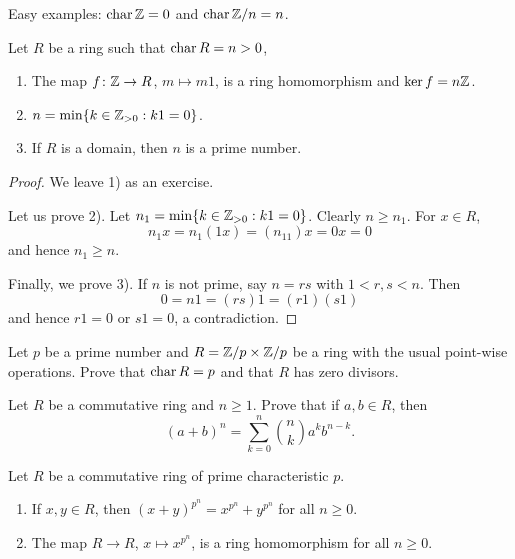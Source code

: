 Easy examples: $\operatorname{char}\mathbb{Z}=0$ and $\operatorname{char}\mathbb{Z}/n=n$.

\begin{proposition}
    Let $R$ be a ring such that $\operatorname{char} R=n>0$,
    \begin{enumerate}
        \item The map $f\colon \mathbb{Z}\to R$, $m\mapsto m1$, is a ring homomorphism and $\ker f=n\mathbb{Z}$.  
        \item $n=\min\{k\in\mathbb{Z}_{>0}:k1=0\}$.
        \item If $R$ is a domain, then $n$ is a prime number.
    \end{enumerate}
\end{proposition}

\begin{proof}
    We leave 1) as an exercise. 
    
    Let us prove 2). Let $n_1=\min\{k\in\mathbb{Z}_{>0}:k1=0\}$. Clearly 
    $n\geq n_1$. For $x\in R$,
    \[ 
    n_1x=n_1(1x)=(n_11)x=0x=0
    \]
    and hence $n_1\geq n$. 
    
    Finally, we prove 3). If $n$ is not prime, say
    $n=rs$ with $1<r,s<n$. Then 
    \[
    0=n1=(rs)1=(r1)(s1)
    \]
    and hence $r1=0$ or $s1=0$, a contradiction. 
\end{proof}

\begin{exercise}
    Let $p$ be a prime number and 
    $R=\mathbb{Z}/p\times\mathbb{Z}/p$ be a ring with the usual point-wise operations. 
    Prove that $\operatorname{char} R=p$ and that $R$ has zero divisors. 
\end{exercise}

\begin{exercise}
    Let $R$ be a commutative ring and $n\geq1$. Prove that
    if $a,b\in R$, then 
    \[
    (a+b)^n=\sum_{k=0}^n\binom{n}{k}a^kb^{n-k}.
    \]
\end{exercise}    

\begin{exercise}
\label{xca:freshman_dream}
    Let $R$ be a commutative ring of prime characteristic $p$. 
    \begin{enumerate}
        \item If $x,y\in R$, then $(x+y)^{p^n}=x^{p^n}+y^{p^n}$ for all $n\geq0$. 
        \item The map $R\to R$, $x\mapsto x^{p^n}$, is a ring homomorphism for all $n\geq0$.
    \end{enumerate}
\end{exercise}

